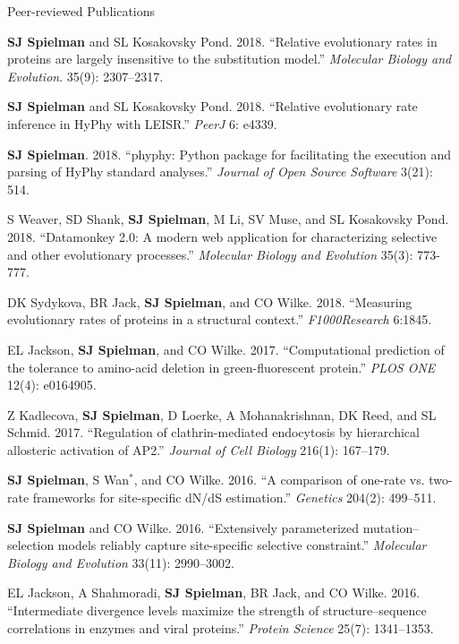 \documentclass{resume} %
\begin{document}
\begin{rSection}{Peer-reviewed Publications}
\begin{etaremune}[leftmargin=1.5em]
\item \textbf{SJ Spielman} and SL Kosakovsky Pond. 2018. ``Relative evolutionary rates in proteins are largely insensitive to the substitution model.'' \emph{Molecular Biology and Evolution}. 35(9): 2307–2317.

\item \textbf{SJ Spielman} and SL Kosakovsky Pond. 2018. ``Relative evolutionary rate inference in HyPhy with LEISR.'' \emph{PeerJ} 6: e4339.

\item \textbf{SJ Spielman}. 2018. ``phyphy: Python package for facilitating the execution and parsing of HyPhy standard analyses.''  \emph{Journal of Open Source Software} 3(21): 514.

\item S Weaver, SD Shank, \textbf{SJ Spielman}, M Li, SV Muse, and SL Kosakovsky Pond. 2018. ``Datamonkey 2.0: A modern web application for characterizing selective and other evolutionary processes.'' \emph{Molecular Biology and Evolution} 35(3): 773-777.

\item DK Sydykova, BR Jack, \textbf{SJ Spielman}, and CO Wilke. 2018. ``Measuring evolutionary rates of proteins in a structural context.'' \emph{F1000Research} 6:1845.

\item EL Jackson, \textbf{SJ Spielman}, and CO Wilke. 2017. ``Computational prediction of the tolerance to amino-acid deletion in green-fluorescent protein.'' \emph{PLOS ONE} 12(4): e0164905.

\item Z Kadlecova, \textbf{SJ Spielman}, D Loerke, A Mohanakrishnan, DK Reed, and SL Schmid. 2017. ``Regulation of clathrin-mediated endocytosis by hierarchical allosteric activation of AP2.'' \emph{Journal of Cell Biology} 216(1): 167--179.

\item \textbf{SJ Spielman}, S Wan$^\ast$, and CO Wilke. 2016. ``A comparison of one-rate vs. two-rate frameworks for site-specific dN/dS estimation.'' \emph{Genetics} 204(2): 499--511.

\item \textbf{SJ Spielman} and CO Wilke. 2016. ``Extensively parameterized mutation--selection models reliably capture site-specific selective constraint.'' \emph{Molecular Biology and Evolution} 33(11): 2990--3002.

\item EL Jackson, A Shahmoradi, \textbf{SJ Spielman}, BR Jack, and CO Wilke. 2016. ``Intermediate divergence levels maximize the strength of structure--sequence correlations in enzymes and viral proteins.'' \emph{Protein Science} 25(7): 1341--1353.


\end{etaremune}
\end{rSection}
\end{document}
